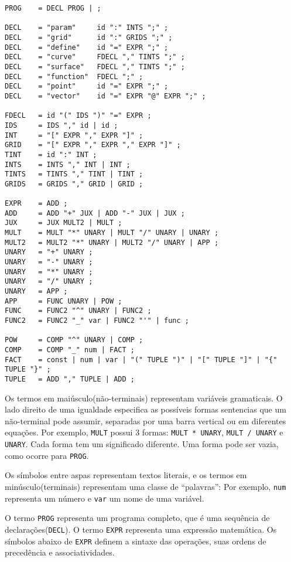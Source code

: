 \newpage
\begin{lstlisting}[caption=Gramática livre de contexto,label=gram]
PROG    = DECL PROG | ;

DECL    = "param"     id ":" INTS ";" ;
DECL    = "grid"      id ":" GRIDS ";" ;
DECL    = "define"    id "=" EXPR ";" ;
DECL    = "curve"     FDECL "," TINTS ";" ;
DECL    = "surface"   FDECL "," TINTS ";" ;
DECL    = "function"  FDECL ";" ;
DECL    = "point"     id "=" EXPR ";" ;
DECL    = "vector"    id "=" EXPR "@" EXPR ";" ;

FDECL   = id "(" IDS ")" "=" EXPR ;
IDS     = IDS "," id | id ;
INT     = "[" EXPR "," EXPR "]" ;
GRID    = "[" EXPR "," EXPR "," EXPR "]" ;
TINT    = id ":" INT ;
INTS    = INTS "," INT | INT ;
TINTS   = TINTS "," TINT | TINT ;
GRIDS   = GRIDS "," GRID | GRID ;

EXPR    = ADD ;
ADD     = ADD "+" JUX | ADD "-" JUX | JUX ;
JUX     = JUX MULT2 | MULT ;
MULT    = MULT "*" UNARY | MULT "/" UNARY | UNARY ;
MULT2   = MULT2 "*" UNARY | MULT2 "/" UNARY | APP ;
UNARY   = "+" UNARY ;
UNARY   = "-" UNARY ;
UNARY   = "*" UNARY ;
UNARY   = "/" UNARY ;
UNARY   = APP ;
APP     = FUNC UNARY | POW ;
FUNC    = FUNC2 "^" UNARY | FUNC2 ;
FUNC2   = FUNC2 "_" var | FUNC2 "'" | func ;

POW     = COMP "^" UNARY | COMP ;
COMP    = COMP "_" num | FACT ;
FACT    = const | num | var | "(" TUPLE ")" | "[" TUPLE "]" | "{" TUPLE "}" ;
TUPLE   = ADD "," TUPLE | ADD ;
\end{lstlisting}

Os termos em maiúsculo(não-terminais) representam variáveis gramaticais.
O lado direito de uma igualdade especifica as possíveis formas sentencias
que um não-terminal pode assumir, 
separadas por uma barra vertical ou em diferentes equações.
Por exemplo, \texttt{MULT} possui 3 formas:
\texttt{MULT * UNARY}, \texttt{MULT / UNARY} e \texttt{UNARY}.
Cada forma tem um significado diferente.
Uma forma pode ser vazia, como ocorre para \texttt{PROG}.

Os símbolos entre aspas representam textos literais,
e os termos em minúsculo(terminais) representam uma classe de ``palavras'':
Por exemplo, \texttt{num} representa um número e \texttt{var} um nome de uma variável.

O termo \texttt{PROG} representa um programa completo,
que é uma sequência de declarações(\texttt{DECL}).
O termo \texttt{EXPR} representa uma expressão matemática.
Os símbolos abaixo de \texttt{EXPR} definem a sintaxe das operações,
suas ordens de precedência e associatividades.

